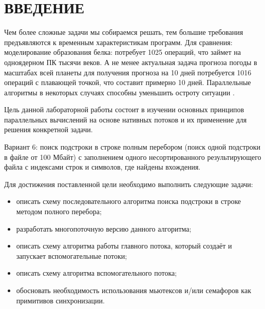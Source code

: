 \section*{ВВЕДЕНИЕ}

Чем более сложные задачи мы собираемся решать, тем большие требования предъявляются к временным характеристикам программ. 
Для сравнения: моделирование образования белка: потребует 1025 операций, что займет на одноядерном ПК тысячи
веков. 
А не менее актуальная задача прогноза погоды в масштабах всей планеты для получения прогноза на 10 дней потребуется 1016 операций с плавающей точкой, что составит примерно 10 дней. 
Параллельные алгоритмы в некоторых случаях способны уменьшить остроту ситуации \cite{крючкова2020программирование}. 

Цель данной лабораторной работы состоит в изучении основных принципов параллельных вычислений на основе нативных потоков и их применение для решения конкретной задачи.

Вариант 6: поиск подстроки в строке полным перебором (поиск одной подстроки в файле от 100 Мбайт) с заполнением одного несортированного результирующего файла с индексами строк и символов, где найдены вхождения.

Для достижения поставленной цели необходимо выполнить следующие задачи:
\begin{itemize}
	\item описать схему последовательного алгоритма поиска подстроки в строке методом полного перебора;
	\item разработать многопоточную версию данного алгоритма;
	\item описать схему алгоритма работы главного потока, который создаёт и запускает вспомогательные потоки;
	\item описать схему алгоритма вспомогательного потока;
	\item обосновать необходимость использования мьютексов и/или семафоров как примитивов синхронизации.
\end{itemize}